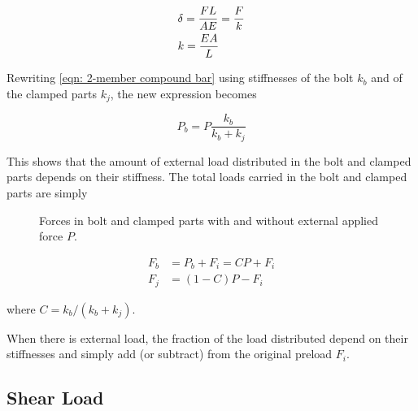 \documentclass[
10pt,
a4paper,
openany,
svgnames,
]{book}
\begin{document}
\[\begin{gathered}
  \delta  = \frac{FL}{AE} = \frac{F}{k} \hfill \\
  k = \frac{EA}{L} \hfill \\ 
\end{gathered} \]

Rewriting \cref{eqn: 2-member compound bar} using stiffnesses of the bolt $k_b$ and of the clamped parts $k_j$, the new expression becomes

\begin{equation}
  P_b = P\frac{k_b}{k_b + k_j}
\end{equation}

This shows that the amount of external load distributed in the bolt and clamped parts depends on their stiffness. The total loads carried in the bolt and clamped parts are simply

\begin{figure}[h]
  \centering
  \caption{Forces in bolt and clamped parts with and without external applied force $P$.}
  \label{fig: bolt-joint interaction}
\end{figure}

\begin{align} \label{eqn: bolt-joint interaction}
  F_b &= P_b + F_i = CP + F_i \\
  F_j &= (1 - C)P - F_i
\end{align}

where $C = k_b/(k_b + k_j)$.

When there is external load, the fraction of the load distributed depend on their stiffnesses and simply add (or subtract) from the original preload $F_i$.

\subsection{Shear Load}
\end{document}
